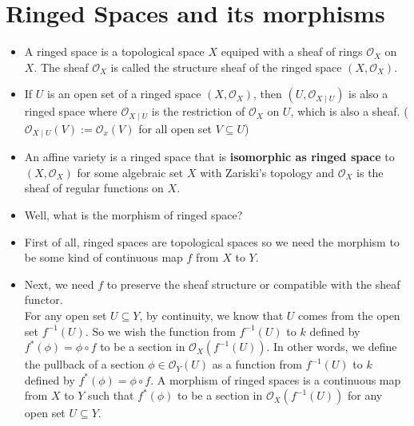 \documentclass[15pt]{scrartcl}
\newcommand{\cO}{\mathcal{O}}
\begin{document}
\section{Ringed Spaces and its morphisms}
\begin{itemize}
    \subsection{Ringed Space and Affine Varieties}
    \item A ringed space is a topological space $X$ equiped with a sheaf of rings $\cO_X$ on $X$. The sheaf $\cO_X$ is called the structure sheaf of the ringed space $(X,\cO_X)$.
    \item If $U$ is an open set of a ringed space $(X,\cO_X)$, then $(U,\cO_{X\mid U})$ is also a ringed space where $\cO_{X\mid U}$ is the restriction of $\cO_X$ on $U$, which is also a sheaf. ($\cO_{X\mid U}(V):=\cO_x(V)$ for all open set $V\subseteq U$)
    \item An affine variety is a ringed space that is \textbf{isomorphic as ringed space} to $(X,\cO_X)$ for some algebraic set $X$ with Zariski's topology and $\cO_X$ is the sheaf of regular functions on $X$.
    \item Well, what is the morphism of ringed space? 
    \item First of all, ringed spaces are topological spaces so we need the morphism to be some kind of continuous map $f$ from $X$ to $Y$. 
    \item Next, we need $f$ to preserve the sheaf structure or compatible with the sheaf functor. 
    \\
    For any open set $U\subseteq Y$, by continuity, we know that $U$ comes from the open set $f^{-1}(U)$. So we wish the function from $f^{-1}(U)$ to $k$ defined by $f^{*}(\phi)=\phi\circ f$ to be a section in $\cO_X(f^{-1}(U))$. In other words, we define the pullback of a section $\phi \in \cO_Y(U)$ as a function from $f^{-1}(U)$ to $k$ defined by $f^{*}(\phi)=\phi\circ f$. A morphism of ringed spaces is a continuous map from $X$ to $Y$ such that $f^{*}(\phi)$ to be a section in $\cO_X(f^{-1}(U))$ for any open set $U\subseteq Y$.
    \\


\end{itemize}
\end{document}
